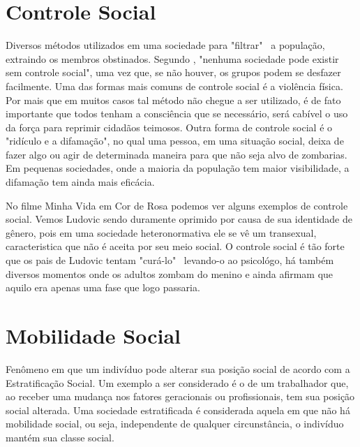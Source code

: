 \documentclass[
	12pt,				%
	openany,
	oneside,			%
	a4paper,			%
	chapter=TITLE,		%
	english,			%
	brazil				%
]{abntex2}
\begin{document}

\frenchspacing

\pretextual

\imprimircapa

\imprimirfolhaderosto

\tableofcontents*
\cleardoublepage

\textual

\chapter{Controle Social}
Diversos métodos utilizados em uma sociedade para "filtrar" \ a população, extraindo os membros obstinados. Segundo , "nenhuma sociedade pode existir sem controle social", uma vez que, se não houver, os grupos podem se desfazer facilmente. Uma das formas mais comuns de controle social é a violência física. Por mais que em muitos casos tal método não chegue a ser utilizado, é de fato importante que todos tenham a consciência que se necessário, será cabível o uso da força para reprimir cidadãos teimosos. Outra forma de controle social é o "ridículo e a difamação", no qual uma pessoa, em uma situação social, deixa de fazer algo ou agir de determinada maneira para que não seja alvo de zombarias. Em pequenas sociedades, onde a maioria da população tem maior visibilidade, a difamação tem ainda mais eficácia.

No filme Minha Vida em Cor de Rosa \cite{minhaVidaEmCorDeRosa} podemos ver alguns exemplos de controle social. Vemos Ludovic sendo duramente oprimido por causa de sua identidade de gênero, pois em uma sociedade heteronormativa ele se vê um transexual, caracteristica que não é aceita por seu meio social. O controle social é tão forte que os pais de Ludovic tentam "curá-lo" \ levando-o ao psicológo, há também diversos momentos onde os adultos zombam do menino e ainda afirmam que aquilo era apenas uma fase que logo passaria.

\chapter{Mobilidade Social}
Fenômeno em que um indivíduo pode alterar sua posição social de acordo com a Estratificação Social. Um exemplo a ser considerado é o de um trabalhador que, ao receber uma mudança nos fatores geracionais ou profissionais, tem sua posição social alterada. Uma sociedade estratificada é considerada aquela em que não há mobilidade social, ou seja, independente de qualquer circunstância, o indivíduo mantém sua classe social.
\end{document}
